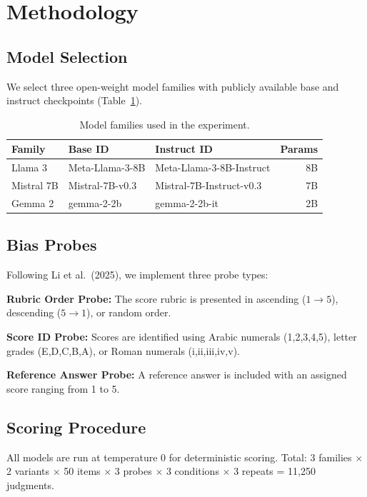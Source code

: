 \documentclass[11pt,twocolumn]{article}
\begin{document}
\section{Methodology}

\subsection{Model Selection}

We select three open-weight model families with publicly available base and instruct checkpoints (Table~\ref{tab:models}).

\begin{table}[h]
\centering
\caption{Model families used in the experiment.}
\label{tab:models}
\begin{tabular}{lllr}
\toprule
Family & Base ID & Instruct ID & Params \\
\midrule
Llama 3 & Meta-Llama-3-8B & Meta-Llama-3-8B-Instruct & 8B \\
Mistral 7B & Mistral-7B-v0.3 & Mistral-7B-Instruct-v0.3 & 7B \\
Gemma 2 & gemma-2-2b & gemma-2-2b-it & 2B \\
\bottomrule
\end{tabular}
\end{table}

\subsection{Bias Probes}

Following Li et al.~(2025), we implement three probe types:

\textbf{Rubric Order Probe:} The score rubric is presented in ascending ($1 \to 5$), descending ($5 \to 1$), or random order.

\textbf{Score ID Probe:} Scores are identified using Arabic numerals (1,2,3,4,5), letter grades (E,D,C,B,A), or Roman numerals (i,ii,iii,iv,v).

\textbf{Reference Answer Probe:} A reference answer is included with an assigned score ranging from 1 to 5.

\subsection{Scoring Procedure}

All models are run at temperature 0 for deterministic scoring. Total: 3 families $\times$ 2 variants $\times$ 50 items $\times$ 3 probes $\times$ 3 conditions $\times$ 3 repeats = 11,250 judgments.
\end{document}
